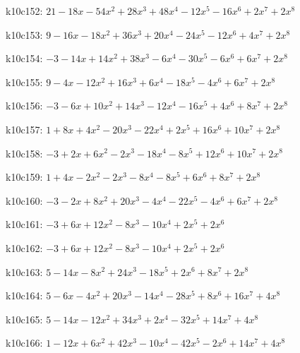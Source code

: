 k10c152: $ 21-18x-54x^{2}+28x^{3}+48x^{4}-12x^{5}-16x^{6}+2x^{7}+2x^{8} $ 

k10c153: $ 9-16x-18x^{2}+36x^{3}+20x^{4}-24x^{5}-12x^{6}+4x^{7}+2x^{8} $ 

k10c154: $ -3-14x+14x^{2}+38x^{3}-6x^{4}-30x^{5}-6x^{6}+6x^{7}+2x^{8} $ 

k10c155: $ 9-4x-12x^{2}+16x^{3}+6x^{4}-18x^{5}-4x^{6}+6x^{7}+2x^{8} $ 

k10c156: $ -3-6x+10x^{2}+14x^{3}-12x^{4}-16x^{5}+4x^{6}+8x^{7}+2x^{8} $ 

k10c157: $ 1+8x+4x^{2}-20x^{3}-22x^{4}+2x^{5}+16x^{6}+10x^{7}+2x^{8} $ 

k10c158: $ -3+2x+6x^{2}-2x^{3}-18x^{4}-8x^{5}+12x^{6}+10x^{7}+2x^{8} $ 

k10c159: $ 1+4x-2x^{2}-2x^{3}-8x^{4}-8x^{5}+6x^{6}+8x^{7}+2x^{8} $ 

k10c160: $ -3-2x+8x^{2}+20x^{3}-4x^{4}-22x^{5}-4x^{6}+6x^{7}+2x^{8} $ 

k10c161: $ -3+6x+12x^{2}-8x^{3}-10x^{4}+2x^{5}+2x^{6} $ 

k10c162: $ -3+6x+12x^{2}-8x^{3}-10x^{4}+2x^{5}+2x^{6} $ 

k10c163: $ 5-14x-8x^{2}+24x^{3}-18x^{5}+2x^{6}+8x^{7}+2x^{8} $ 

k10c164: $ 5-6x-4x^{2}+20x^{3}-14x^{4}-28x^{5}+8x^{6}+16x^{7}+4x^{8} $ 

k10c165: $ 5-14x-12x^{2}+34x^{3}+2x^{4}-32x^{5}+14x^{7}+4x^{8} $ 

k10c166: $ 1-12x+6x^{2}+42x^{3}-10x^{4}-42x^{5}-2x^{6}+14x^{7}+4x^{8} $ 

